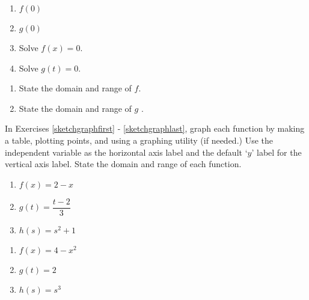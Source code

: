 \documentclass{ximera}
\begin{document}
\begin{enumerate}


\item $f(0)$

\item $g(0)$

\item  Solve $f(x) = 0$.

\item  Solve $g(t) = 0$. 


\end{enumerate}




\begin{enumerate}


\item  State the domain and range of $f$.

\item  State the domain and range of $g$ . \label{functionvaluesfromgraphlast}


\end{enumerate}


 

In Exercises \ref{sketchgraphfirst} - \ref{sketchgraphlast}, graph each function by making a table, plotting points, and using a graphing utility (if needed.)  Use the independent variable as the horizontal axis label and the default `$y$' label for the vertical axis label.  State the domain and range of each function. 


\begin{enumerate}
\item $f(x) = 2-x$ \label{sketchgraphfirst}
\item $g(t) = \dfrac{t - 2}{3}$
\item $h(s) = s^2 + 1$

\end{enumerate}


\begin{enumerate}

\item $f(x) = 4-x^2$
\item $g(t) = 2$
\item $h(s) = s^3$

\end{enumerate}
\end{document}
